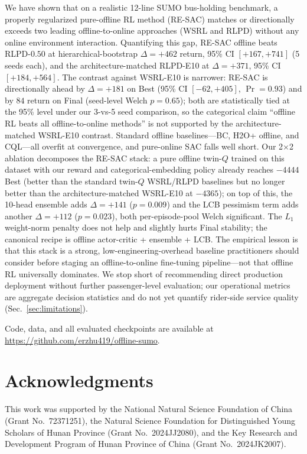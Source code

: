 \documentclass[journal,10pt]{IEEEtran}
\begin{document}
We have shown that on a realistic 12-line SUMO bus-holding benchmark, a properly regularized pure-offline RL method (RE-SAC) matches or directionally exceeds two leading offline-to-online approaches (WSRL and RLPD) without any online environment interaction. Quantifying this gap, RE-SAC offline beats RLPD-$0.50$ at hierarchical-bootstrap $\Delta = +462$ return, 95\% CI $[+167, +741]$ (5 seeds each), and the architecture-matched RLPD-E10 at $\Delta = +371$, 95\% CI $[+184, +564]$. The contrast against WSRL-E10 is narrower: RE-SAC is directionally ahead by $\Delta = +181$ on Best (95\% CI $[-62, +405]$, $\Pr=0.93$) and by $84$ return on Final (seed-level Welch $p=0.65$); both are statistically tied at the 95\% level under our 3-vs-5 seed comparison, so the categorical claim ``offline RL beats all offline-to-online methods'' is not supported by the architecture-matched WSRL-E10 contrast. Standard offline baselines---BC, H2O+ offline, and CQL---all overfit at convergence, and pure-online SAC falls well short. Our 2$\times$2 ablation decomposes the RE-SAC stack: a pure offline twin-$Q$ trained on this dataset with our reward and categorical-embedding policy already reaches $-4444$ Best (better than the standard twin-$Q$ WSRL/RLPD baselines but no longer better than the architecture-matched WSRL-E10 at $-4365$); on top of this, the 10-head ensemble adds $\Delta = +141$ ($p=0.009$) and the LCB pessimism term adds another $\Delta = +112$ ($p=0.023$), both per-episode-pool Welch significant. The $L_1$ weight-norm penalty does not help and slightly hurts Final stability; the canonical recipe is offline actor-critic + ensemble + LCB. The empirical lesson is that this stack is a strong, low-engineering-overhead baseline practitioners should consider before staging an offline-to-online fine-tuning pipeline---not that offline RL universally dominates. We stop short of recommending direct production deployment without further passenger-level evaluation; our operational metrics are aggregate decision statistics and do not yet quantify rider-side service quality (Sec.~\ref{sec:limitations}).

Code, data, and all evaluated checkpoints are available at \url{https://github.com/erzhu419/offline-sumo}.

\section*{Acknowledgments}
This work was supported by the National Natural Science Foundation of China (Grant No.~72371251), the Natural Science Foundation for Distinguished Young Scholars of Hunan Province (Grant No.~2024JJ2080), and the Key Research and Development Program of Hunan Province of China (Grant No.~2024JK2007).
\end{document}
